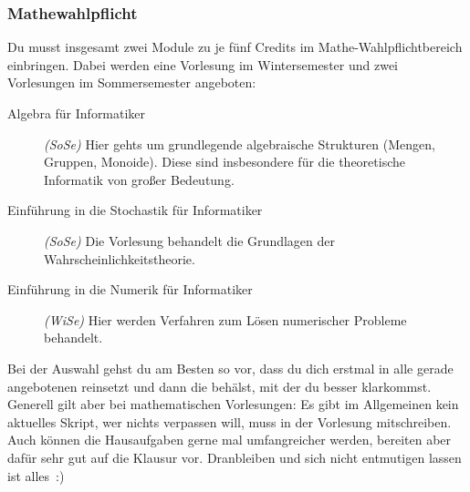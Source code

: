 
\subsubsection{Mathewahlpflicht}
Du musst insgesamt zwei Module zu je fünf Credits
	im Mathe-Wahlpflichtbereich einbringen. Dabei werden eine Vorlesung im Wintersemester und zwei
	Vorlesungen im Sommersemester angeboten:

	
	\begin{description} 
		\item[Algebra für Informatiker] \emph{(SoSe)} Hier gehts um grundlegende
		algebraische Strukturen (Mengen, Gruppen, Monoide). Diese sind insbesondere für die
		theoretische Informatik von großer Bedeutung.
		\item[Einführung in die Stochastik für Informatiker] \emph{(SoSe)} Die
		Vorlesung behandelt die Grundlagen der
		Wahrscheinlichkeitstheorie. 
		\item[Einführung in die Numerik für Informatiker] \emph{(WiSe)} Hier werden Verfahren zum Lösen numerischer Probleme behandelt. 
	\end{description}

	Bei der Auswahl gehst du am Besten so vor, dass du dich erstmal
	in alle gerade angebotenen reinsetzt und dann die behälst, mit der du besser
	klarkommst. Generell gilt aber bei mathematischen Vorlesungen: Es
	gibt im Allgemeinen kein aktuelles Skript, wer nichts verpassen
	will, muss in der Vorlesung mitschreiben. Auch können die
	Hausaufgaben gerne mal umfangreicher werden, bereiten aber dafür
	sehr gut auf die Klausur vor. Dranbleiben und sich nicht
	entmutigen lassen ist alles~:)